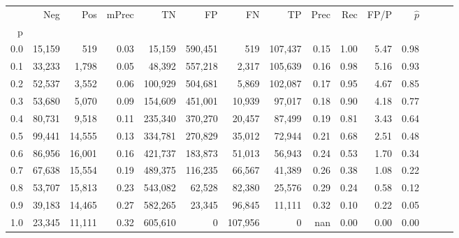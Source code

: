 \begin{tabular}{rrrrrrrrrrrrrrr}
\toprule
{} &     Neg &     Pos & mPrec &       TN &       FP &       FN &       TP &  Prec &   Rec &  FP/P & $\hat{p}$ \\
p   &         &         &       &          &          &          &          &       &       &       &           \\
\midrule
0.0 &  15,159 &     519 &  0.03 &   15,159 &  590,451 &      519 &  107,437 &  0.15 &  1.00 &  5.47 &      0.98 \\
0.1 &  33,233 &   1,798 &  0.05 &   48,392 &  557,218 &    2,317 &  105,639 &  0.16 &  0.98 &  5.16 &      0.93 \\
0.2 &  52,537 &   3,552 &  0.06 &  100,929 &  504,681 &    5,869 &  102,087 &  0.17 &  0.95 &  4.67 &      0.85 \\
0.3 &  53,680 &   5,070 &  0.09 &  154,609 &  451,001 &   10,939 &   97,017 &  0.18 &  0.90 &  4.18 &      0.77 \\
0.4 &  80,731 &   9,518 &  0.11 &  235,340 &  370,270 &   20,457 &   87,499 &  0.19 &  0.81 &  3.43 &      0.64 \\
0.5 &  99,441 &  14,555 &  0.13 &  334,781 &  270,829 &   35,012 &   72,944 &  0.21 &  0.68 &  2.51 &      0.48 \\
0.6 &  86,956 &  16,001 &  0.16 &  421,737 &  183,873 &   51,013 &   56,943 &  0.24 &  0.53 &  1.70 &      0.34 \\
0.7 &  67,638 &  15,554 &  0.19 &  489,375 &  116,235 &   66,567 &   41,389 &  0.26 &  0.38 &  1.08 &      0.22 \\
0.8 &  53,707 &  15,813 &  0.23 &  543,082 &   62,528 &   82,380 &   25,576 &  0.29 &  0.24 &  0.58 &      0.12 \\
0.9 &  39,183 &  14,465 &  0.27 &  582,265 &   23,345 &   96,845 &   11,111 &  0.32 &  0.10 &  0.22 &      0.05 \\
1.0 &  23,345 &  11,111 &  0.32 &  605,610 &        0 &  107,956 &        0 &   nan &  0.00 &  0.00 &      0.00 \\
\bottomrule
\end{tabular}
